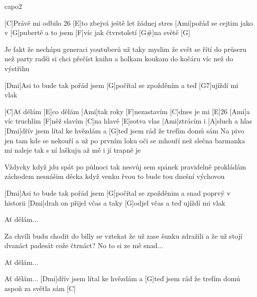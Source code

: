 \hfill capo2

[C]Právě mi odbilo 26
[E]to zbejvá ještě let žádnej stres
[Ami]pořád se cejtim jako v [G]pubertě
a to jsem [F]víc jak čtvrstoletí [G#]na světě [G]

Je fakt že nechápu generaci youtuberů
už taky myslim že svět se řítí do průseru
než party radši si chci přečíst knihu
a holkam koukam do kočáru víc než do výstřihu

[Dmi]Asi to bude tak
pořád jsem [G]počítal se zpožděním
a teď [G7]ujíždí mi vlak

[C]Ať dělám [E]co dělám [Ami]tak roky [F]nezastavím
[C]dnes je mi [E]26 [Ami]a víc truchlím [F]něž slavím
[C]na hlavě [E]sotva vlas [Ami]ztrácím i [A]sluch a hlas
[Dmi]dřív jsem lítal ke hvězdám a [G]teď jsem rád že trefím domů sám
\slpc
Na pivo jen tam kde se nekouří
a už po prvním loku oči se mhouří
než slečna barmanka mi naleje
tak s ní laškuju až mě i jí trapně je 

Vždycky když jdu spát po půlnoci tak nesvůj sem
spánek pravidelně prokládám záchodem
nesnášim děcka když venku řvou
to bude tou dnešní výchovou

[Dmi]Asi to bude tak
pořád jsem [G]počítal se zpožděnim
a snad poprvý v historii [Dmi] drah
on přijel včas a taky [G]odjel včas
a teď ujíždí mi vlak

Ať dělám...

Za chvíli budu chodit do billy
se vztekat že už zase šunku zdražili
a že už stojí dvanáct padesát
cože čtrnáct? No to si ze mě snad...

Ať dělám...

Ať dělám...
[Dmi]dřív jsem lítal ke hvězdám a [G]teď jsem rád že trefím domů aspoň za světla sám [C]


